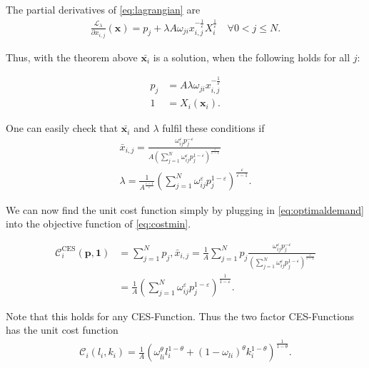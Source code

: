 \documentclass{article}
\newcommand{\costf}[1]{\mathscr{C}_#1}
\begin{document}
The partial derivatives of \eqref{eq:lagrangian} are
\begin{align}
  \frac{\mathcal L_\lambda}{\partial x_{i,j}}(\mathbf x) = p_{j} + \lambda A \omega_{ji} x_{i,j}^{-\frac{1}{\varepsilon}} X_i^{\frac{1}{\varepsilon}} \quad \forall 0 < j \leq N.
\end{align}



Thus, with the theorem above $\bar {\mathbf x_{i}}$ is a solution, when the following holds for all $j$:

\begin{align}
  p_j &= A \lambda \omega_{ji} x_{i,j}^{-\frac{1}{\varepsilon}}  \\
  1 &= X_i(\mathbf x_i).
\end{align}

One can easily check that $\bar {\mathbf x_i}$ and $\lambda$ fulfil these conditions if
\begin{align}
  \label{eq:optimaldemand}
  \bar x_{i,j} = \frac{\omega_{ij}^{ \varepsilon} p_{j}^{- \varepsilon}}{A \left( \sum_{j=1}^N \omega_{ij}^{\varepsilon} p_{j}^{1 - \varepsilon} \right)^{\frac {\varepsilon}{\varepsilon - 1}}} \\
  \lambda = \frac{1}{A^\frac{\varepsilon - 1}{\varepsilon}}\left( \sum_{j=1}^N \omega_{ij}^{\varepsilon} p_{j}^{1 - \varepsilon} \right)^{\frac {\varepsilon}{\varepsilon - 1}}.
\end{align}

We can now find the unit cost function simply by plugging in \eqref{eq:optimaldemand} into the objective function of \eqref{eq:costmin}.

\begin{align*}
  \mathscr{C}_i^{\text{CES}}(\mathbf p,\mathbf 1) &= \sum_{j=1}^N p_j,\bar x_{i,j} = \frac{1}{A} \sum_{j=1}^N p_j \frac{\omega_{ij}^{ \varepsilon} p_{j}^{- \varepsilon}}{\left( \sum_{j=1}^N \omega_{ij}^{\varepsilon} p_{j}^{1 - \varepsilon} \right)^{\frac {\varepsilon}{\varepsilon - 1}}} \\
              &=\frac{1}{A} \left( \sum_{j=1}^N  \omega_{ij}^{ \varepsilon} p_{j}^{1 - \varepsilon} \right)^{\frac{1}{1 - \varepsilon}}.
\end{align*}

Note that this holds for any CES-Function. Thus the two factor CES-Functions has the unit cost function
\begin{align*}
  \costf{i} (l_i,k_i) = \frac 1 A (\omega_{li}^\theta l_i^{1-\theta} + (1 - \omega_{li})^\theta k_i ^{1-\theta})^{\frac{1}{1- \theta}}.
\end{align*}
\end{document}
